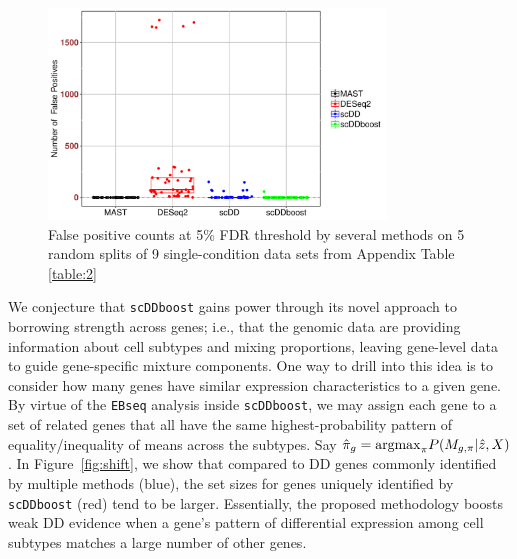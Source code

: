 \documentclass[aoas,preprint]{imsart}
\begin{document}
\begin{figure}[H]
\includegraphics[width = 0.8\textwidth]{Figs/fdrCounts.pdf}
 \caption{False positive counts at 5\% FDR threshold by several methods on  5 random splits of 9 single-condition
data sets from Appendix Table \ref{table:2}} \label{nullperm}
\end{figure}


We conjecture that \verb+scDDboost+ gains power through its novel approach to borrowing strength across genes;
i.e., that the genomic data are providing information about cell subtypes and mixing proportions,
leaving gene-level data to guide gene-specific mixture components. One way to drill into this
idea is to consider how many genes have similar expression characteristics to a given gene.
By virtue of the \verb+EBseq+ analysis inside \verb+scDDboost+, we may assign each gene to
a set of related genes  that all have the same highest-probability pattern of equality/inequality of means across
the subtypes. Say $\hat \pi_g = {\rm argmax}_{\pi} P( M_{g,\pi} | \hat z, X)$. 
In Figure~\ref{fig:shift}, we show
that compared to DD genes commonly identified by multiple methods (blue), the set sizes for genes
uniquely identified by \verb+scDDboost+ (red) tend to be larger.  Essentially, the proposed methodology
 boosts weak DD evidence when a gene's pattern of differential expression among cell subtypes
matches a large number of other genes. 
\end{document}
